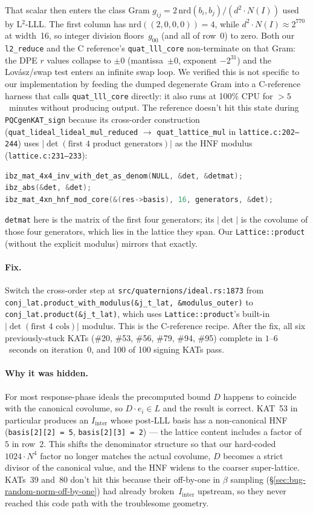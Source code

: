 That scalar then enters the class Gram
$g_{ij} = 2 \, \mathrm{nrd}(b_i, b_j) / (d^2 \cdot N(I))$ used
by L$^2$-LLL.  The first column has
$\mathrm{nrd}((2,0,0,0)) = 4$, while $d^2 \cdot N(I) \approx 2^{770}$
at width~16, so integer division floors~$g_{00}$ (and all of
row~0) to zero.  Both our \texttt{l2\_reduce} and the C reference's
\texttt{quat\_lll\_core} non-terminate on that Gram: the DPE
$r$ values collapse to $\pm 0$ (mantissa~$\pm 0$, exponent
$-2^{31}$) and the Lov\'asz/swap test enters an infinite swap
loop.  We verified this is not specific to our implementation
by feeding the dumped degenerate Gram into a C-reference
harness that calls \texttt{quat\_lll\_core} directly:
it also runs at 100\% CPU for $>5$~minutes without producing
output.  The reference doesn't hit this state during
\texttt{PQCgenKAT\_sign} because its cross-order construction
(\texttt{quat\_lideal\_lideal\_mul\_reduced} $\to$
\texttt{quat\_lattice\_mul} in
\texttt{lattice.c:202--244}) uses
$|\det(\text{first 4 product generators})|$
as the HNF modulus
(\texttt{lattice.c:231--233}):
\begin{lstlisting}[language=C]
ibz_mat_4x4_inv_with_det_as_denom(NULL, &det, &detmat);
ibz_abs(&det, &det);
ibz_mat_4xn_hnf_mod_core(&(res->basis), 16, generators, &det);
\end{lstlisting}
\noindent
\texttt{detmat} here is the matrix of the first four generators;
its $|\det|$ is the covolume of those four generators, which
lies in the lattice they span.  Our \texttt{Lattice::product}
(without the explicit modulus) mirrors that exactly.

\paragraph{Fix.}  Switch the cross-order step at
\texttt{src/quaternions/ideal.rs:1873} from
\texttt{conj\_lat.product\_with\_modulus(\&j\_t\_lat, \&modulus\_outer)}
to \texttt{conj\_lat.product(\&j\_t\_lat)}, which uses
\texttt{Lattice::product}'s built-in
$|\det(\text{first 4 cols})|$ modulus.  This is the C-reference
recipe.  After the fix, all six previously-stuck KATs
(\#20, \#53, \#56, \#79, \#94, \#95) complete in $1$--$6$~seconds
on iteration~0, and 100 of 100 signing KATs pass.

\paragraph{Why it was hidden.}  For most response-phase
ideals the precomputed bound $D$ happens to coincide with the
canonical covolume, so $D \cdot e_i \in L$ and the result is
correct.  KAT~53 in particular produces an
$I_{\mathrm{inter}}$ whose post-LLL basis has a non-canonical
HNF (\texttt{basis[2][2] = 5}, \texttt{basis[2][3] = 2}) ---
the lattice content includes a factor of~$5$ in row~2.  This
shifts the denominator structure so that our hard-coded
$1024 \cdot N^4$ factor no longer matches the actual covolume,
$D$ becomes a strict divisor of the canonical value, and the
HNF widens to the coarser super-lattice.  KATs~39 and~80 don't
hit this because their off-by-one in $\beta$ sampling
(\S\ref{sec:bug-random-norm-off-by-one}) had already
broken~$I_{\mathrm{inter}}$ upstream, so they never reached
this code path with the troublesome geometry.

